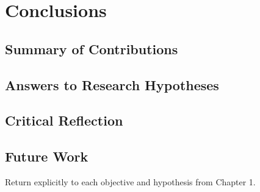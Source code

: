 \chapter{Conclusions}

\section{Summary of Contributions}
\section{Answers to Research Hypotheses}
\section{Critical Reflection}
\section{Future Work}

Return explicitly to each objective and hypothesis from Chapter 1.
